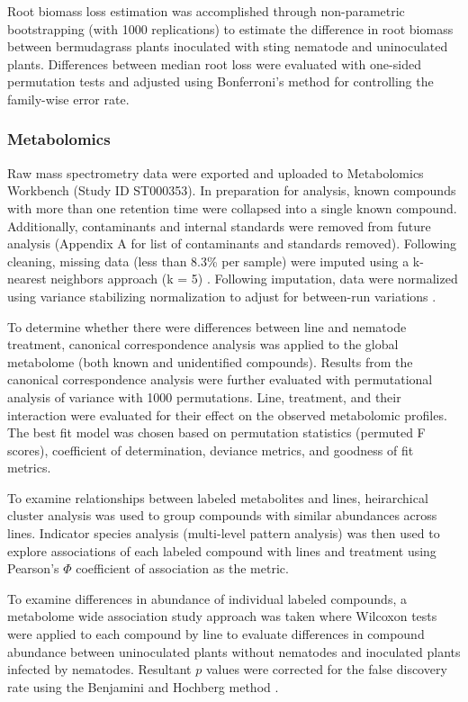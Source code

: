\documentclass[9pt,lineno]{elife}
\begin{document}
Root biomass loss estimation was accomplished through non-parametric bootstrapping (with 1000 replications) to estimate the difference in root biomass between bermudagrass plants inoculated with sting nematode and uninoculated plants.  Differences between median root loss were evaluated with one-sided permutation tests and adjusted using Bonferroni's method for controlling the family-wise error rate.


\subsubsection{Metabolomics}

Raw mass spectrometry data were exported and uploaded to Metabolomics Workbench (Study ID ST000353).  In preparation for analysis, known compounds with more than one retention time were collapsed into a single known compound.  Additionally, contaminants and internal standards were removed from future analysis (Appendix A for list of contaminants and standards removed).  Following cleaning, missing data (less than 8.3\% per sample) were imputed using a k-nearest neighbors approach (k = 5) \citep{armitage2015missing}.  Following imputation, data were normalized using variance stabilizing normalization to adjust for between-run variations \citep{li2016performance}.  

To determine whether there were differences between line and nematode treatment, canonical correspondence analysis was applied to the global metabolome (both known and unidentified compounds).  Results from the canonical correspondence analysis were further evaluated with permutational analysis of variance with 1000 permutations. Line, treatment, and their interaction were evaluated for their effect on the observed metabolomic profiles.  The best fit model was chosen based on permutation statistics (permuted F scores), coefficient of determination, deviance metrics, and goodness of fit metrics.  

To examine relationships between labeled metabolites and lines, heirarchical cluster analysis was used to group compounds with similar abundances across lines.  Indicator species analysis (multi-level pattern analysis) was then used to explore associations of each labeled compound with lines and treatment using Pearson's $\Phi$ coefficient of association as the metric. 

To examine differences in abundance of individual labeled compounds, a metabolome wide association study approach was taken where Wilcoxon tests were applied to each compound by line to evaluate differences in compound abundance between uninoculated plants without nematodes and inoculated plants infected by nematodes.  Resultant $p$ values were corrected for the false discovery rate using the Benjamini and Hochberg method \citep{benjamini1995controlling}.  
\end{document}
